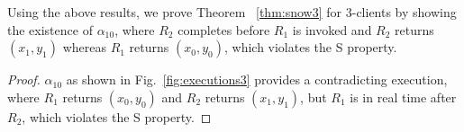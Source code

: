 Using the above results,  we prove Theorem ~\ref{thm:snow3} for 3-clients by showing the existence of $\alpha_{10}$,  where $R_2$ completes before $R_1$ is invoked and  $R_2$ returns $(x_1, y_1)$ whereas $R_1$ returns $(x_0, y_0)$, which  violates the S property. 


\begin{proof}
\sloppy 
$\alpha_{10}$ as shown in Fig.~\ref{fig:executions3} provides a contradicting execution, where $R_1$ returns $(x_0, y_0)$ and $R_2$ returns $(x_1, y_1)$, but $R_1$ is in real time after $R_2$, which violates the S property.
\end{proof}

\setcounter{algorithm}{3}

